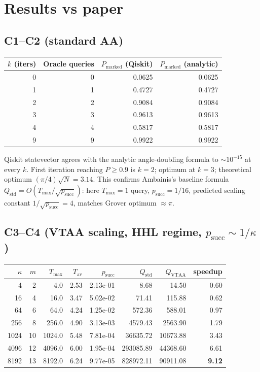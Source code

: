\documentclass[11pt]{article}
\begin{document}
\section{Results vs paper}

\subsection{C1--C2 (standard AA)}

\begin{tabular}{r r r r}
\toprule
$k$ (iters) & Oracle queries & $P_{\text{marked}}$ (Qiskit) & $P_{\text{marked}}$ (analytic) \\
\midrule
0 & 0 & 0.0625 & 0.0625 \\
1 & 1 & 0.4727 & 0.4727 \\
2 & 2 & 0.9084 & 0.9084 \\
3 & 3 & 0.9613 & 0.9613 \\
4 & 4 & 0.5817 & 0.5817 \\
9 & 9 & 0.9922 & 0.9922 \\
\bottomrule
\end{tabular}

Qiskit statevector agrees with the analytic angle-doubling formula to
$\sim 10^{-15}$ at every $k$. First iteration reaching $P \geq 0.9$ is $k=2$;
optimum at $k=3$; theoretical optimum $(\pi/4)\sqrt{N} = 3.14$.
This confirms Ambainis's baseline formula
$Q_{\mathrm{std}} = O(T_{\max}/\sqrt{p_{\mathrm{succ}}})$: here
$T_{\max} = 1$ query, $p_{\mathrm{succ}} = 1/16$, predicted scaling constant
$1/\sqrt{p_{\mathrm{succ}}} = 4$, matches Grover optimum $\approx \pi$.

\subsection{C3--C4 (VTAA scaling, HHL regime, $p_{\mathrm{succ}} \sim 1/\kappa$)}

\begin{tabular}{r r r r r r r r}
\toprule
$\kappa$ & $m$ & $T_{\max}$ & $T_{\mathrm{av}}$ & $p_{\mathrm{succ}}$ &
$Q_{\mathrm{std}}$ & $Q_{\mathrm{VTAA}}$ & speedup \\
\midrule
    4 & 2 &     4.0 & 2.53 & 2.13e-01 &       8.68 &      14.50 & 0.60 \\
   16 & 4 &    16.0 & 3.47 & 5.02e-02 &      71.41 &     115.88 & 0.62 \\
   64 & 6 &    64.0 & 4.24 & 1.25e-02 &     572.36 &     588.01 & 0.97 \\
  256 & 8 &   256.0 & 4.90 & 3.13e-03 &    4579.43 &    2563.90 & 1.79 \\
 1024 & 10 &  1024.0 & 5.48 & 7.81e-04 &   36635.72 &   10673.88 & 3.43 \\
 4096 & 12 &  4096.0 & 6.00 & 1.95e-04 &  293085.89 &   44368.60 & 6.61 \\
 8192 & 13 &  8192.0 & 6.24 & 9.77e-05 &  828972.11 &   90911.08 & \textbf{9.12} \\
\bottomrule
\end{tabular}
\end{document}
